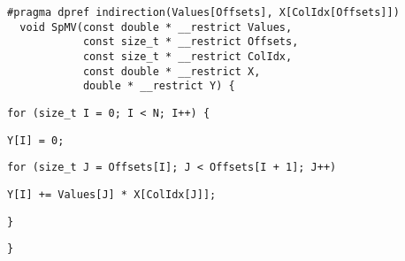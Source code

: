 \begin{lstlisting}[style=cppcode]
  #pragma dpref indirection(Values[Offsets], X[ColIdx[Offsets]])
  void SpMV(const double * __restrict Values,
            const size_t * __restrict Offsets,
            const size_t * __restrict ColIdx,
            const double * __restrict X,
            double * __restrict Y) {
\end{lstlisting}\vspace{-\baselineskip}

\begin{lstlisting}[style=cppcode, backgroundcolor=\color{yellow!15}, firstnumber=last]
    for (size_t I = 0; I < N; I++) {
\end{lstlisting}\vspace{-\baselineskip}

\begin{lstlisting}[style=cppcode, backgroundcolor=\color{red!15}, firstnumber=last]
      Y[I] = 0;
\end{lstlisting}\vspace{-\baselineskip}

\begin{lstlisting}[style=cppcode, backgroundcolor=\color{green!15}, firstnumber=last]
      for (size_t J = Offsets[I]; J < Offsets[I + 1]; J++)
\end{lstlisting}\vspace{-\baselineskip}

\begin{lstlisting}[style=cppcode, backgroundcolor=\color{red!15}, firstnumber=last]
        Y[I] += Values[J] * X[ColIdx[J]];
\end{lstlisting}\vspace{-\baselineskip}

\begin{lstlisting}[style=cppcode, backgroundcolor=\color{yellow!15}, firstnumber=last]
    }
\end{lstlisting}\vspace{-\baselineskip}

\begin{lstlisting}[style=cppcode, firstnumber=last]
  }
\end{lstlisting}\vspace{-\baselineskip}
